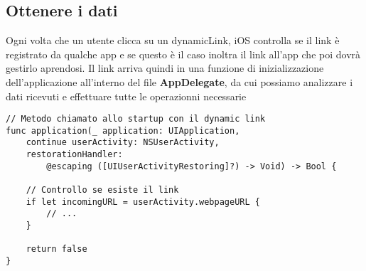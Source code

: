 \subsection*{Ottenere i dati}

Ogni volta che un utente clicca su un dynamicLink, iOS controlla
se il link è registrato da qualche app e se questo è il caso
inoltra il link all'app che poi dovrà gestirlo aprendosi. 
Il link arriva quindi in una funzione di inizializzazione dell'applicazione all'interno del
file \textbf{AppDelegate}, da cui possiamo analizzare i dati ricevuti e effettuare tutte le operazionni necessarie

\begin{verbatim}
// Metodo chiamato allo startup con il dynamic link
func application(_ application: UIApplication,
    continue userActivity: NSUserActivity,
    restorationHandler: 
        @escaping ([UIUserActivityRestoring]?) -> Void) -> Bool {
        
    // Controllo se esiste il link
    if let incomingURL = userActivity.webpageURL {
        // ...
    }
    
    return false
}
\end{verbatim}